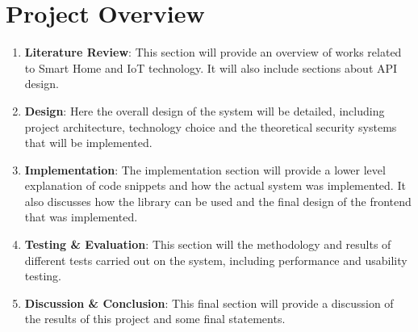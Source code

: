 \section{Project Overview} \label{sec:intro:overview} 
\begin{enumerate}
    \item \textbf{Literature Review}:
        This section will provide an overview of works related to Smart Home and IoT technology. It will also include sections about API design. 
    \item \textbf{Design}:
        Here the overall design of the system will be detailed, including project architecture, technology choice and the theoretical security systems that will be implemented.
    \item \textbf{Implementation}:
        The implementation section will provide a lower level explanation of code snippets and how the actual system was implemented. It also discusses how the library can be used and the final design of the frontend that was implemented.
    \item \textbf{Testing \& Evaluation}:
        This section will the methodology and results of different tests carried out on the system, including performance and usability testing.
    \item \textbf{Discussion \& Conclusion}:
        This final section will provide a discussion of the results of this project and some final statements.
\end{enumerate}
